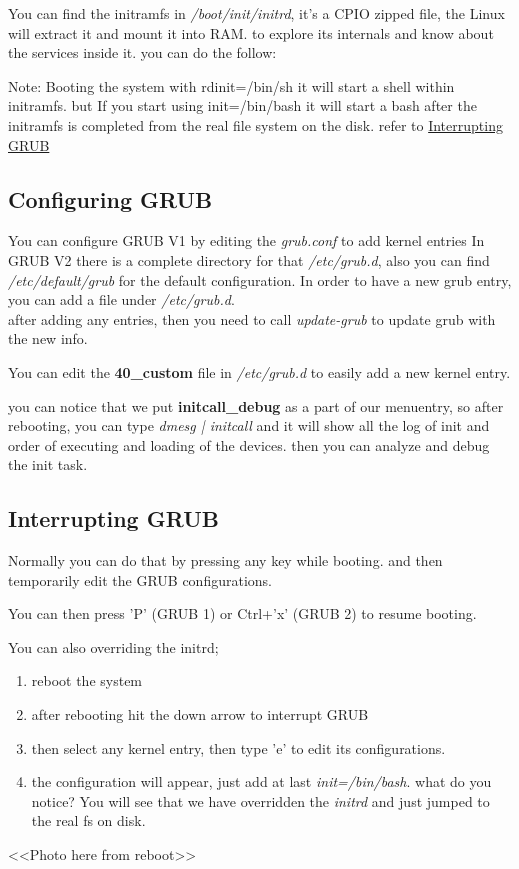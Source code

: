\documentclass{article}
\begin{document}
You can find the initramfs in \textit{/boot/init/initrd}, it's a CPIO zipped file, the Linux will extract it and mount it into RAM.
to explore its internals and know about the services inside it. you can do the follow:




Note: Booting the system with rdinit=/bin/sh it will start a shell within initramfs. but If you start using init=/bin/bash it will start a bash after the initramfs is completed from the real file system on the disk.
refer to \hyperref[sec:interrupt-grub]{Interrupting GRUB}

\subsection{Configuring GRUB}
You can configure GRUB V1 by editing the \textit{grub.conf} to add kernel entries
In GRUB V2 there is a complete directory for that \textit{/etc/grub.d}, also you can find \textit{/etc/default/grub} for the default configuration.
In order to have a new grub entry, you can add a file under \textit{/etc/grub.d}.\\

after adding any entries, then you need to call \textit{update-grub} to update grub with the new info.

You can edit the \textbf{40\_custom} file in \textit{/etc/grub.d} to easily add a new kernel entry.



you can notice that we put \textbf{initcall\_debug} as a part of our menuentry, so after rebooting, you can type \textit{dmesg | initcall} and it will show all the log of init and order of executing and loading of the devices. then you can analyze and debug the init task. 

\subsection{Interrupting GRUB}
\label{sec:interrupt-grub}
Normally you can do that by pressing any key while booting. and then temporarily edit the GRUB configurations.

You can then press 'P' (GRUB 1) or Ctrl+'x' (GRUB 2) to resume booting.

You can also overriding the initrd; 
\begin{enumerate}
    \item reboot the system
    \item after rebooting hit the down arrow to interrupt GRUB
    \item then select any kernel entry, then type 'e' to edit its configurations.
    \item the configuration will appear, just add at last \textit{init=/bin/bash}. what do you notice?
    You will see that we have overridden the \textit{initrd} and just jumped to the real fs on disk.
\end{enumerate}
<<Photo here from reboot>>
\end{document}
